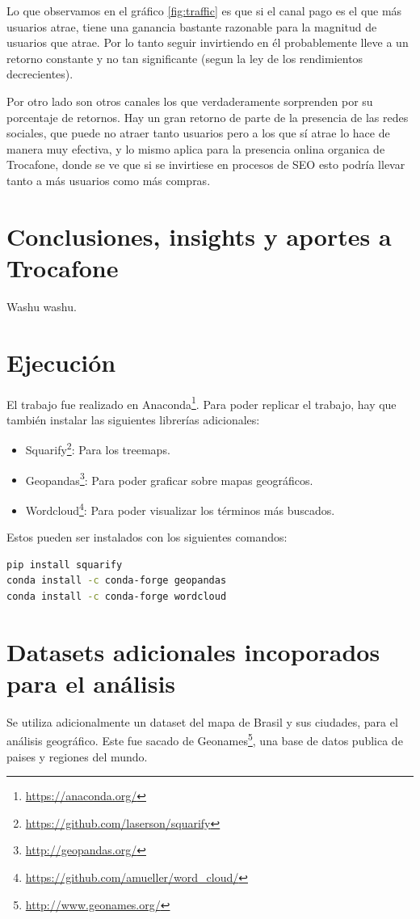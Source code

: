 \documentclass[a4paper]{article}
\begin{document}
Lo que observamos en el gráfico \ref{fig:traffic} es que si el canal pago es el que más usuarios atrae, tiene una ganancia bastante razonable para la magnitud de usuarios que atrae. Por lo tanto seguir invirtiendo en él probablemente lleve a un retorno constante y no tan significante (segun la ley de los rendimientos decrecientes). 

Por otro lado son otros canales los que verdaderamente sorprenden por su porcentaje de retornos. Hay un gran retorno de parte de la presencia de las redes sociales, que puede no atraer tanto usuarios pero a los que sí atrae lo hace de manera muy efectiva, y lo mismo aplica para la presencia onlina organica de Trocafone, donde se ve que si se invirtiese en procesos de SEO esto podría llevar tanto a más usuarios como más compras.

\section{Conclusiones, insights y aportes a Trocafone}

Washu washu.

\newpage
\appendix

\section{Ejecución}

El trabajo fue realizado en Anaconda\footnote{\url{https://anaconda.org/}}. Para poder replicar el trabajo, hay que también instalar las siguientes librerías adicionales:

\begin{itemize}
	\item{Squarify\footnote{\url{https://github.com/laserson/squarify}}: Para los treemaps.}
	\item{Geopandas\footnote{\url{http://geopandas.org/}}: Para poder graficar sobre mapas geográficos.}
	\item{Wordcloud\footnote{\url{https://github.com/amueller/word_cloud/}}: Para poder visualizar los términos más buscados.}
\end{itemize}

Estos pueden ser instalados con los siguientes comandos: 
\begin{lstlisting}[language=sh]
pip install squarify
conda install -c conda-forge geopandas
conda install -c conda-forge wordcloud
\end{lstlisting}

\section{Datasets adicionales incoporados para el análisis}

Se utiliza adicionalmente un dataset del mapa de Brasil y sus ciudades, para el análisis geográfico. Este fue sacado de  Geonames\footnote{\url{http://www.geonames.org/}}, una base de datos publica de paises y regiones del mundo.
\end{document}
